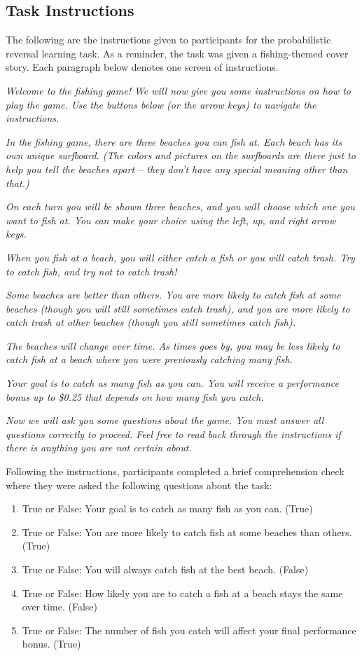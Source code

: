 \documentclass[a4paper,notitlepage,12pt]{article}
\begin{document}
\clearpage
\subsection*{Task Instructions}

The following are the instructions given to participants for the probabilistic reversal learning task. As a reminder, the task was given a fishing-themed cover story. Each paragraph below denotes one screen of instructions.

\textit{Welcome to the fishing game! We will now give you some instructions on how to play the game. Use the buttons below (or the arrow keys) to navigate the instructions.}

\textit{In the fishing game, there are three beaches you can fish at. Each beach has its own unique surfboard. (The colors and pictures on the surfboards are there just to help you tell the beaches apart – they don’t have any special meaning other than that.)}

\textit{On each turn you will be shown three beaches, and you will choose which one you want to fish at. You can make your choice using the left, up, and right arrow keys.}

\textit{When you fish at a beach, you will either catch a fish or you will catch trash. Try to catch fish, and try not to catch trash!}

\textit{Some beaches are better than others. You are more likely to catch fish at some beaches (though you will still sometimes catch trash), and you are more likely to catch trash at other beaches (though you still sometimes catch fish).}

\textit{The beaches will change over time. As times goes by, you may be less likely to catch fish at a beach where you were previously catching many fish.}

\textit{Your goal is to catch as many fish as you can. You will receive a performance bonus up to \$0.25 that depends on how many fish you catch.}

\textit{Now we will ask you some questions about the game. You must answer all questions correctly to proceed. Feel free to read back through the instructions if there is anything you are not certain about.}

Following the instructions, participants completed a brief comprehension check where they were asked the following questions about the task:

\begin{enumerate}
    \item True or False: Your goal is to catch as many fish as you can. (True)
    \item True or False: You are more likely to catch fish at some beaches than others. (True)
    \item True or False: You will always catch fish at the best beach. (False)
    \item True or False: How likely you are to catch a fish at a beach stays the same over time. (False)
    \item True or False: The number of fish you catch will affect your final performance bonus. (True)
\end{enumerate}
\end{document}
